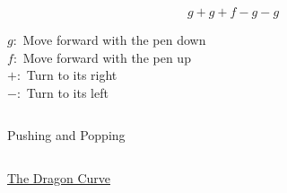 \begin{frame}{}
  \[
    g + g + f − g − g
  \]

  \vspace{0.60cm}
  \begin{center}
    $g:$ Move forward with the pen down \\[15pt]
    $f:$ Move forward with the pen up \\[15pt]
    $+:$ Turn to its right \\[15pt]
    $-:$ Turn to its left
  \end{center}
\end{frame}

\begin{frame}{}
\end{frame}

\begin{frame}{}
  \begin{columns}
      \begin{center}
        Pushing and Popping
      \end{center}
      \pause
  \end{columns}
\end{frame}

\begin{frame}{}
  \begin{columns}
      \pause
  \end{columns}
\end{frame}

\begin{frame}{}
\end{frame}

\begin{frame}{}
  \begin{center}
    \href{https://en.wikipedia.org/wiki/L-system\#Example_6:_Dragon_curve}{The Dragon Curve}
  \end{center}
\end{frame}

